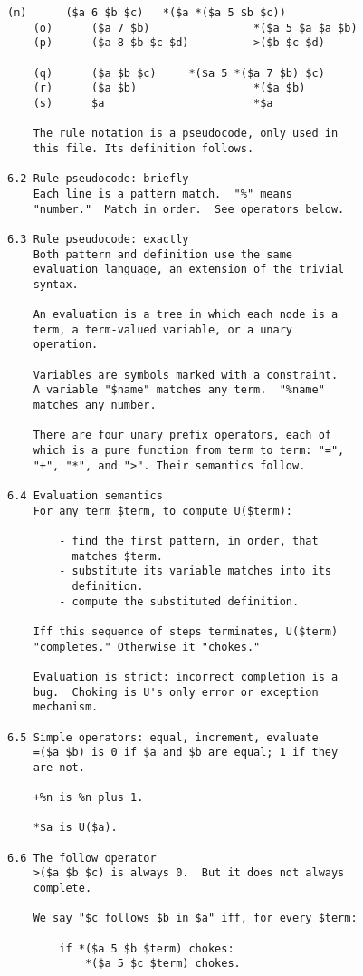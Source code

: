 \documentclass[twoside]{article}
\begin{document}
\begin{lstlisting}[label=lst:u,caption={\texttt{U}, 31 January 2006.  The earliest extant patriarch of the Nock family.},style=listingcode]
    (n)      ($a 6 $b $c)   *($a *($a 5 $b $c))
    (o)      ($a 7 $b)                *($a 5 $a $a $b)
    (p)      ($a 8 $b $c $d)          >($b $c $d)

    (q)      ($a $b $c)     *($a 5 *($a 7 $b) $c)
    (r)      ($a $b)                  *($a $b)
    (s)      $a                       *$a

    The rule notation is a pseudocode, only used in
    this file. Its definition follows.

6.2 Rule pseudocode: briefly
    Each line is a pattern match.  "%" means
    "number."  Match in order.  See operators below.

6.3 Rule pseudocode: exactly
    Both pattern and definition use the same
    evaluation language, an extension of the trivial
    syntax.

    An evaluation is a tree in which each node is a
    term, a term-valued variable, or a unary
    operation.

    Variables are symbols marked with a constraint.
    A variable "$name" matches any term.  "%name"
    matches any number.

    There are four unary prefix operators, each of
    which is a pure function from term to term: "=",
    "+", "*", and ">". Their semantics follow.

6.4 Evaluation semantics
    For any term $term, to compute U($term):

        - find the first pattern, in order, that
          matches $term.
        - substitute its variable matches into its
          definition.
        - compute the substituted definition.

    Iff this sequence of steps terminates, U($term)
    "completes." Otherwise it "chokes."

    Evaluation is strict: incorrect completion is a
    bug.  Choking is U's only error or exception
    mechanism.

6.5 Simple operators: equal, increment, evaluate
    =($a $b) is 0 if $a and $b are equal; 1 if they
    are not.

    +%n is %n plus 1.

    *$a is U($a).

6.6 The follow operator
    >($a $b $c) is always 0.  But it does not always
    complete.

    We say "$c follows $b in $a" iff, for every $term:

        if *($a 5 $b $term) chokes:
            *($a 5 $c $term) chokes.


\end{lstlisting}
\end{document}
